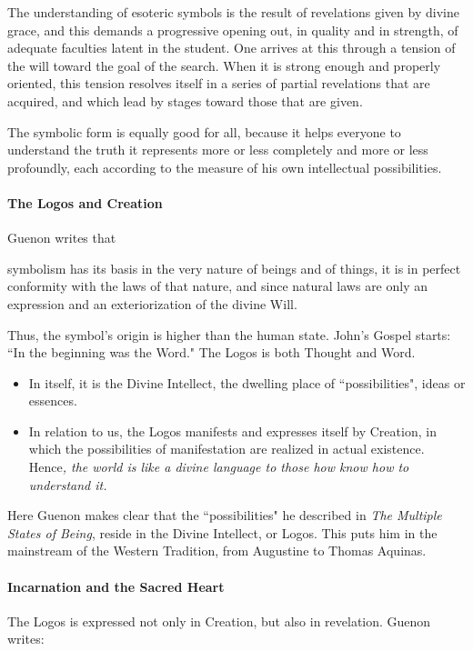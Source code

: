 \begin{quotex}
The understanding of esoteric symbols is the result of revelations given by divine grace, and this demands a progressive opening out, in quality and in strength, of adequate faculties latent in the student. One arrives at this through a tension of the will toward the goal of the search. When it is strong enough and properly oriented, this tension resolves itself in a series of partial revelations that are acquired, and which lead by stages toward those that are given.

The symbolic form is equally good for all, because it helps everyone to understand the truth it represents more or less completely and more or less profoundly, each according to the measure of his own intellectual possibilities. 

\end{quotex}
\paragraph{The Logos and Creation}
Guenon writes that

\begin{quotex}
symbolism has its basis in the very nature of beings and of things, it is in perfect conformity with the laws of that nature, and since natural laws are only an expression and an exteriorization of the divine Will. 

\end{quotex}
Thus, the symbol's origin is higher than the human state. John's Gospel starts: ``In the beginning was the Word." The Logos is both Thought and Word. 

\begin{itemize}
\item In itself, it is the Divine Intellect, the dwelling place of ``possibilities", ideas or essences. 
\item In relation to us, the Logos manifests and expresses itself by Creation, in which the possibilities of manifestation are realized in actual existence. Hence\emph{, the world is like a divine language to those how know how to understand it.} 
\end{itemize}
Here Guenon makes clear that the ``possibilities" he described in \emph{The Multiple States of Being}, reside in the Divine Intellect, or Logos. This puts him in the mainstream of the Western Tradition, from Augustine to Thomas Aquinas.

\paragraph{Incarnation and the Sacred Heart}
The Logos is expressed not only in Creation, but also in revelation. Guenon writes:

